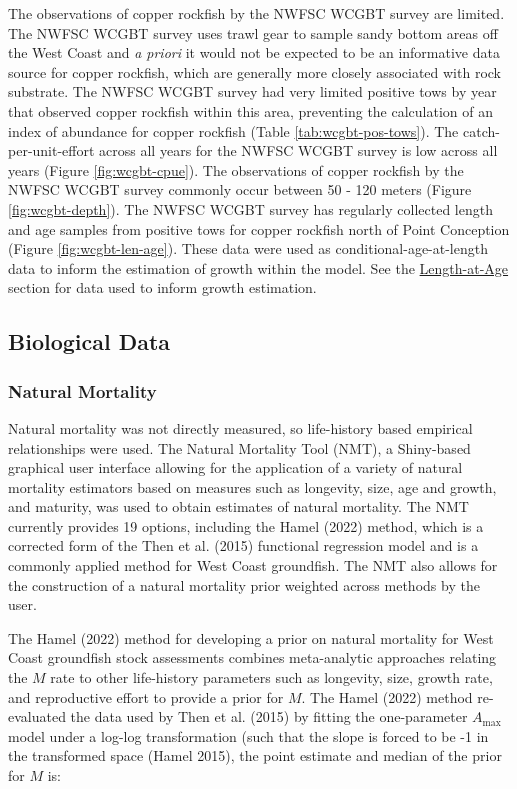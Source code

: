 \documentclass[11pt,
  english,
  letterpaper,
]{article}
\begin{document}
The observations of copper rockfish by the NWFSC WCGBT survey are limited. The NWFSC WCGBT survey uses trawl gear to sample sandy bottom areas off the West Coast and \emph{a priori} it would not be expected to be an informative data source for copper rockfish, which are generally more closely associated with rock substrate. The NWFSC WCGBT survey had very limited positive tows by year that observed copper rockfish within this area, preventing the calculation of an index of abundance for copper rockfish (Table \ref{tab:wcgbt-pos-tows}). The catch-per-unit-effort across all years for the NWFSC WCGBT survey is low across all years (Figure \ref{fig:wcgbt-cpue}). The observations of copper rockfish by the NWFSC WCGBT survey commonly occur between 50 - 120 meters (Figure \ref{fig:wcgbt-depth}). The NWFSC WCGBT survey has regularly collected length and age samples from positive tows for copper rockfish north of Point Conception (Figure \ref{fig:wcgbt-len-age}). These data were used as conditional-age-at-length data to inform the estimation of growth within the model. See the \protect\hyperlink{length-at-age}{Length-at-Age} section for data used to inform growth estimation.

\hypertarget{biological-data}{%
\subsection{Biological Data}\label{biological-data}}

\hypertarget{natural-mortality}{%
\subsubsection{Natural Mortality}\label{natural-mortality}}

Natural mortality was not directly measured, so life-history based empirical relationships were used. The Natural Mortality Tool (NMT), a Shiny-based graphical user interface allowing for the application of a variety of natural mortality estimators based on measures such as longevity, size, age and growth, and maturity, was used to obtain estimates of natural mortality. The NMT currently provides 19 options, including the Hamel (2022) method, which is a corrected form of the Then et al. (2015) functional regression model and is a commonly applied method for West Coast groundfish. The NMT also allows for the construction of a natural mortality prior weighted across methods by the user.

The Hamel (2022) method for developing a prior on natural mortality for West Coast groundfish stock assessments combines meta-analytic approaches relating the \(M\) rate to other life-history parameters such as longevity, size, growth rate, and reproductive effort to provide a prior for \(M\). The Hamel (2022) method re-evaluated the data used by Then et al. (2015) by fitting the one-parameter \(A_{\text{max}}\) model under a log-log transformation (such that the slope is forced to be -1 in the transformed space (Hamel 2015), the point estimate and median of the prior for \(M\) is:
\end{document}
